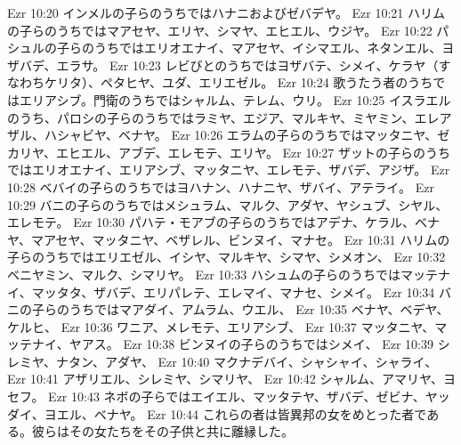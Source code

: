 Ezr 10:20  インメルの子らのうちではハナニおよびゼバデヤ。
Ezr 10:21  ハリムの子らのうちではマアセヤ、エリヤ、シマヤ、エヒエル、ウジヤ。
Ezr 10:22  パシュルの子らのうちではエリオエナイ、マアセヤ、イシマエル、ネタンエル、ヨザバデ、エラサ。
Ezr 10:23  レビびとのうちではヨザバテ、シメイ、ケラヤ（すなわちケリタ）、ペタヒヤ、ユダ、エリエゼル。
Ezr 10:24  歌うたう者のうちではエリアシブ。門衛のうちではシャルム、テレム、ウリ。
Ezr 10:25  イスラエルのうち、パロシの子らのうちではラミヤ、エジア、マルキヤ、ミヤミン、エレアザル、ハシャビヤ、ベナヤ。
Ezr 10:26  エラムの子らのうちではマッタニヤ、ゼカリヤ、エヒエル、アブデ、エレモテ、エリヤ。
Ezr 10:27  ザットの子らのうちではエリオエナイ、エリアシブ、マッタニヤ、エレモテ、ザバデ、アジザ。
Ezr 10:28  ベバイの子らのうちではヨハナン、ハナニヤ、ザバイ、アテライ。
Ezr 10:29  バニの子らのうちではメシュラム、マルク、アダヤ、ヤシュブ、シヤル、エレモテ。
Ezr 10:30  パハテ・モアブの子らのうちではアデナ、ケラル、ベナヤ、マアセヤ、マッタニヤ、ベザレル、ビンヌイ、マナセ。
Ezr 10:31  ハリムの子らのうちではエリエゼル、イシヤ、マルキヤ、シマヤ、シメオン、
Ezr 10:32  ベニヤミン、マルク、シマリヤ。
Ezr 10:33  ハシュムの子らのうちではマッテナイ、マッタタ、ザバデ、エリパレテ、エレマイ、マナセ、シメイ。
Ezr 10:34  バニの子らのうちではマアダイ、アムラム、ウエル、
Ezr 10:35  ベナヤ、ベデヤ、ケルヒ、
Ezr 10:36  ワニア、メレモテ、エリアシブ、
Ezr 10:37  マッタニヤ、マッテナイ、ヤアス。
Ezr 10:38  ビンヌイの子らのうちではシメイ、
Ezr 10:39  シレミヤ、ナタン、アダヤ、
Ezr 10:40  マクナデバイ、シャシャイ、シャライ、
Ezr 10:41  アザリエル、シレミヤ、シマリヤ、
Ezr 10:42  シャルム、アマリヤ、ヨセフ。
Ezr 10:43  ネボの子らではエイエル、マッタテヤ、ザバデ、ゼビナ、ヤッダイ、ヨエル、ベナヤ。
Ezr 10:44  これらの者は皆異邦の女をめとった者である。彼らはその女たちをその子供と共に離縁した。


